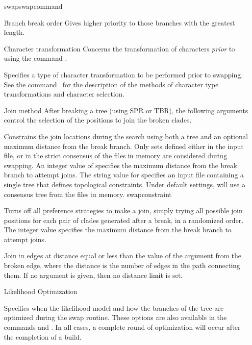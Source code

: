 \begin{command}{swap}{swapcommand}
\begin{arguments}
\begin{argumentgroup}{Branch break order}
{Gives higher priority to those branches with the greatest length.}
{}

\end{argumentgroup}


\begin{argumentgroup}{Character transformation} 
{Concerns the transformation of characters \emph{prior} to using the command 
.}

{Specifies a type of character transformation to be performed
prior to swapping.
See the command~ for
the description of the methods of character type transformations
and character selection.}
{}
\end{argumentgroup}


\begin{argumentgroup}{Join method}
{After breaking a tree (using SPR or TBR), the following 
arguments control the selection of the positions to join the broken
clades.}

{Constrains the join locations during the search
using both a tree and an optional maximum distance from the
break branch. Only sets defined either in the input file, or
in the strict consensus of the files in memory are considered
during swapping. An integer value of 
specifies the maximum distance from the break branch to
attempt joins. The string value for 
specifies an input file containing a single tree that
defines topological constraints. Under default settings,
 will use a consensus tree from the
files in memory.}
{swapconstraint}

{Turns off all preference strategies to make a join, simply trying
all possible join positions for each pair of clades generated
after a break, in a randomized order. The integer value 
specifies the maximum distance from the break branch to
attempt joins.}
{}

{Join in edges at distance equal or less than the value of the argument
from the broken edge, where the distance is the number of edges
in the path connecting them. If no argument is given, then no
distance limit is set.}
{}

\end{argumentgroup}

\begin{argumentgroup}{Likelihood Optimization}
{Specifies when the likelihood model and how the branches of the
tree are optimized during the swap routine. These options are also
available in the commands  and .
In all cases, a complete round of optimization will occur
after the completion of a build.

}
\end{argumentgroup}
\end{arguments}
\end{command}
